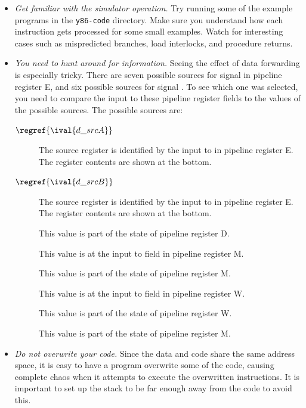 \documentclass[11pt]{article}
\begin{document}
\begin{itemize}
\item {\em Get familiar with the simulator operation.}  Try running
some of the example programs in the \texttt{y86-code} directory.  Make
sure you understand how each instruction gets processed for some small
examples.  Watch for interesting cases such as mispredicted branches,
load interlocks, and procedure returns.

\item {\em You need to hunt around for information.}  Seeing the
effect of data forwarding is especially tricky.  There are seven
possible sources for signal  in pipeline register E, and
six possible sources for signal \@.  To see which one was
selected, you need to compare the input to these pipeline register
fields to the values of the possible sources.
The possible sources
are:
\begin{description}
\item[$\regref{\ival{d\_srcA}}$] The source register is identified by
the input to  in pipeline register E\@.  The register contents are shown at the bottom.
\item[$\regref{\ival{d\_srcB}}$] The source register is identified by
the input to  in pipeline register E\@.  The register contents are shown at the bottom.
\item[] This value is part of the state of pipeline register D\@.
\item[] This value is at the input to field 
in pipeline register M\@.
\item[] This value is part of the state of pipeline register M\@.
\item[] This value is at the input to field 
in pipeline register W.
\item[] This value is part of the state of pipeline register W\@.
\item[] This value is part of the state of pipeline register M\@.
\end{description}

\item {\em Do not overwrite your code.}  Since the data and code share
the same address space, it is easy to have a program overwrite some of
the code, causing complete chaos when it attempts to execute the
overwritten instructions.  It is important to set up the stack to be
far enough away from the code to avoid this.


\end{itemize}
\end{document}
